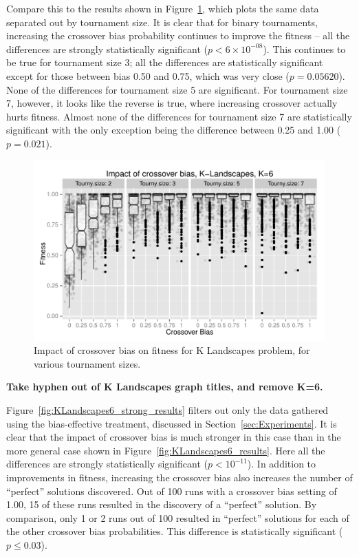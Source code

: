\documentclass{sig-alternate}
\begin{document}
Compare this to the results shown in Figure~\ref{fig:KLandscapes6_XO_bias_impact_facets}, which plots the same data
separated out by tournament size. It is clear that for binary tournaments, increasing the crossover bias probability
continues to improve the fitness -- all the differences are strongly statistically significant ($p<6\times 10^{-08}$).
This continues to be true for tournament size 3; all the differences are statistically significant except for those
between bias 0.50 and 0.75, which was very close ($p=0.05620$). None of the differences for tournament size 5 are
significant. For tournament size 7, however, it looks like the reverse is true, where increasing crossover actually
hurts fitness. Almost none of the differences for tournament size 7 are statistically significant with the only
exception being the difference between 0.25 and 1.00 ($p=0.021$).

\begin{figure}
\centering
\includegraphics[width=0.45 \textwidth]{Plots/KLandscapes6_XO_bias_impact_facets.pdf}
\caption{Impact of crossover bias on fitness for K Landscapes problem, for various tournament sizes.}
\label{fig:KLandscapes6_XO_bias_impact_facets}
\end{figure}

\textbf{Take hyphen out of K Landscapes graph titles, and remove K=6.}

Figure~\ref{fig:KLandscapes6_strong_results} filters out only the data gathered using the bias-effective treatment,
discussed in Section~\ref{sec:Experiments}. It is clear that the impact of crossover bias is much stronger in this case
than in the more general case shown in Figure~\ref{fig:KLandscapes6_results}. Here all the differences are strongly
statistically significant ($p < 10^{-11}$). In addition to improvements in fitness, increasing the crossover bias also
increases the number of ``perfect'' solutions discovered. Out of 100 runs with a crossover bias setting of 1.00, 15 of
these runs resulted in the discovery of a ``perfect'' solution. By comparison, only 1 or 2 runs out of 100 resulted in
``perfect'' solutions for each of the other crossover bias probabilities. This difference is statistically significant
($p \leq 0.03$).
\end{document}
